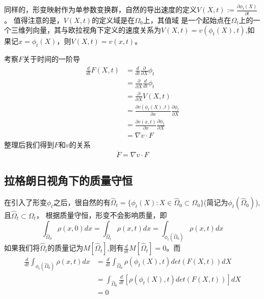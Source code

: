 同样的，形变映射作为单参数变换群，自然的导出速度的定义$V(X,t):= \frac{\partial \phi_t(X)}{\partial t}$。 值得注意的是，$V(X,t)$的定义域是在$\Omega_0$上，其值域
是一个起始点在$\Omega_t$上的一个三维列向量，其与欧拉视角下定义的速度关系为$V(X,t) = v(\phi_t(X),t)$,如果记$x = \phi_t(X)$，则$V(X,t) = v(x,t)$。

考察$F$关于时间的一阶导
\begin{equation}
    \begin{split}
        \frac{d}{dt}F(X,t) &= \frac{d}{dt}\frac{\partial}{\partial X}\phi_t\\
        &= \frac{\partial}{\partial X} \frac{d}{dt} \phi_t\\
        &= \frac{\partial}{\partial X} V(X,t)\\
        &= \frac{\partial v(\phi_t(X),t)}{\partial x}\frac{\partial \phi_t}{\partial X}\\
        &= \frac{\partial v(x,t)}{\partial x}\frac{\partial \phi_t}{\partial X}\\
        &= \nabla v \cdot F\nonumber
    \end{split}
\end{equation}
整理后我们得到$F$和$v$的关系
\begin{equation}
    \dot{F} = \nabla v \cdot F
\end{equation}


\subsection{拉格朗日视角下的质量守恒}
在引入了形变$\phi_t$之后，很自然的有$\hat{\Omega}_t = \{\phi_t(X):X\in \hat{\Omega}_0 \subset \Omega_0 \}$(简记为$\phi_t(\hat{\Omega}_0)$),且$\hat{\Omega}_t \subset \Omega_t$，
根据质量守恒，形变不会影响质量，即
$$\int_{\hat{\Omega}_0} \rho(x,0)dx = \int_{\hat{\Omega}_t} \rho(x,t)dx = \int_{\phi_t(\hat{\Omega}_0)} \rho(x,t)dx$$
如果我们将$\hat{\Omega}_t$的质量记为$M[\hat{\Omega}_t]$,则有$\frac{d}{dt}M[\hat{\Omega}_t] = 0$。而
\begin{equation}
    \begin{split}
        \frac{d}{dt} \int_{\phi_t(\hat{\Omega}_0)} \rho(x,t)dx &= \frac{d}{dt} \int_{\hat{\Omega}_0} \rho(\phi_t(X),t) det(F(X,t))dX\\
        &= \int_{\hat{\Omega}_0} \frac{d}{dt} [\rho(\phi_t(X),t) det(F(X,t))] dX \\
        &= 0\nonumber
    \end{split}
\end{equation}

